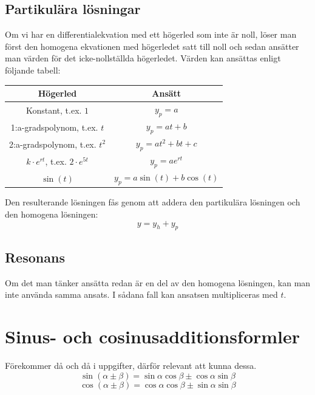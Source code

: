 \documentclass{article}
\newenvironment{ankiflashcard}[1]{}{}
\begin{document}
\begin{appendix}
\begin{ankiflashcard}{Repetera envariabeln: ange lösningarna till en typisk andra ordningens linjär homogen differentialekvation med konstanta koefficienter.}
\subsection*{Partikulära lösningar}

Om vi har en differentialekvation med ett högerled som inte är noll, löser man först den homogena ekvationen med högerledet satt till noll och sedan ansätter man värden för det icke-nollställda högerledet. Värden kan ansättas enligt följande tabell:
\begin{center}
\begin{tabular}{|c|c|}
\hline
Högerled & Ansätt \\
\hline
Konstant, t.ex. $ 1 $ & $ y_p = a $ \\
\hline
1:a-gradspolynom, t.ex. $ t $ & $ y_p = at + b $ \\
\hline
2:a-gradspolynom, t.ex. $ t^2 $ & $ y_p = at^2 + bt + c $ \\
\hline
$ k \cdot e^{rt} $, t.ex. $ 2 \cdot e^{5t} $ & $ y_p = ae^{rt} $ \\
\hline
$ \sin(t) $ & $ y_p = a\sin(t) + b\cos(t) $ \\
\hline
\end{tabular}
\end{center}

Den resulterande lösningen fås genom att addera den partikulära lösningen och den homogena lösningen:
$$
y = y_h + y_p
$$

\subsection*{Resonans}

Om det man tänker ansätta redan är en del av den homogena lösningen, kan man inte använda samma ansats. I sådana fall kan ansatsen multipliceras med $ t $.

    
\end{ankiflashcard}

\begin{ankiflashcard}{Ange additionsformler för sinus och cosinus}
    \section{Sinus- och cosinusadditionsformler}
    Förekommer då och då i uppgifter, därför relevant att kunna dessa.
    $$\sin(\alpha\pm\beta)=\sin \alpha \cos \beta \pm \cos \alpha \sin \beta$$
     $$\cos(\alpha\pm\beta)=\cos \alpha \cos \beta \pm \sin \alpha \sin \beta$$
\end{ankiflashcard}


\end{appendix}
\end{document}

